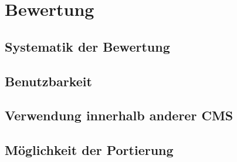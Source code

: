 \chapter{Bewertung}
\missingall
\section{Systematik der Bewertung}
\missingall
\section{Benutzbarkeit}
\missingall
\section{Verwendung innerhalb anderer CMS}
\missingall
\section{Möglichkeit der Portierung}
\missingall